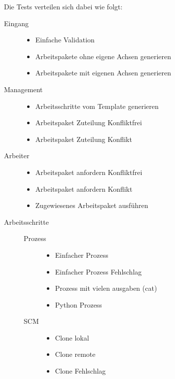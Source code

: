 Die Tests verteilen sich dabei wie folgt:

\begin{description}
    \item[Eingang] \hfill
    \begin{itemize}
        \item Einfache Validation
        \item Arbeitspakete ohne eigene Achsen generieren
        \item Arbeitspakete mit eigenen Achsen generieren
    \end{itemize}
    \item[Management] \hfill
    \begin{itemize}
        \item Arbeitsschritte vom Template generieren
        \item Arbeitspaket Zuteilung Konfliktfrei
        \item Arbeitspaket Zuteilung Konflikt
    \end{itemize}
    \item[Arbeiter] \hfill
    \begin{itemize}
        \item Arbeitspaket anfordern Konfliktfrei
        \item Arbeitspaket anfordern Konflikt
        \item Zugewiesenes Arbeitspaket ausführen
    \end{itemize}
    \item[Arbeitsschritte] \hfill
    \begin{description}
        \item[Prozess] \hfill
        \begin{itemize}
            \item Einfacher Prozess
            \item Einfacher Prozess Fehlschlag
            \item Prozess mit vielen ausgaben (cat)
            \item Python Prozess
        \end{itemize}
        \item[SCM] \hfill
        \begin{itemize}
            \item Clone lokal
            \item Clone remote
            \item Clone Fehlschlag
        \end{itemize}
    \end{description}
\end{description}


